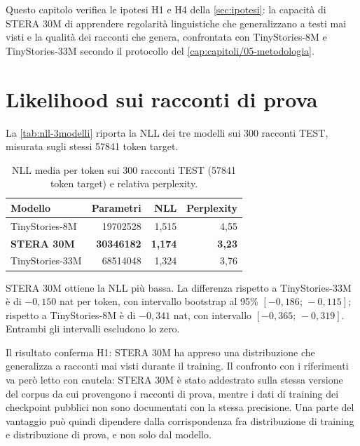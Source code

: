 Questo capitolo verifica le ipotesi H1 e H4 della \autoref{sec:ipotesi}: la capacità di STERA 30M di apprendere regolarità linguistiche che generalizzano a testi mai visti e la qualità dei racconti che genera, confrontata con TinyStories-8M e TinyStories-33M secondo il protocollo del \autoref{cap:capitoli/05-metodologia}.



\section{Likelihood sui racconti di prova}
\label{sec:risultati-nll}

La \autoref{tab:nll-3modelli} riporta la NLL dei tre modelli sui 300 racconti TEST, misurata sugli stessi \num{57841} token target.

\begin{table}[htbp]
\centering
\small
\begin{tabular}{lrrr}
\toprule
Modello & Parametri & NLL & Perplexity \\
\midrule
TinyStories-8M & \num{19702528} & 1,515 & 4,55 \\
\textbf{STERA 30M} & \textbf{\num{30346182}} & \textbf{1,174} & \textbf{3,23} \\
TinyStories-33M & \num{68514048} & 1,324 & 3,76 \\
\bottomrule
\end{tabular}
\caption{NLL media per token sui 300 racconti TEST (\num{57841} token target) e relativa perplexity.}
\label{tab:nll-3modelli}
\end{table}

STERA 30M ottiene la NLL più bassa. La differenza rispetto a TinyStories-33M è di $-0{,}150$ nat per token, con intervallo bootstrap al 95\% $[-0{,}186;\,-0{,}115]$; rispetto a TinyStories-8M è di $-0{,}341$ nat, con intervallo $[-0{,}365;\,-0{,}319]$. Entrambi gli intervalli escludono lo zero.

Il risultato conferma H1: STERA 30M ha appreso una distribuzione che generalizza a racconti mai visti durante il training. Il confronto con i riferimenti va però letto con cautela: STERA 30M è stato addestrato sulla stessa versione del corpus da cui provengono i racconti di prova, mentre i dati di training dei checkpoint pubblici non sono documentati con la stessa precisione. Una parte del vantaggio può quindi dipendere dalla corrispondenza fra distribuzione di training e distribuzione di prova, e non solo dal modello.

